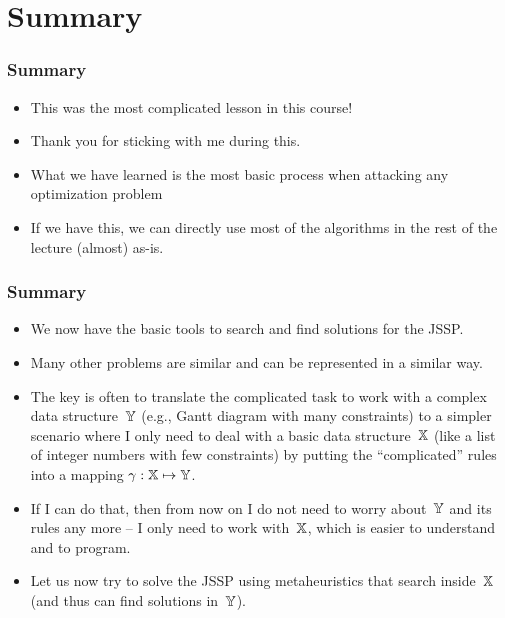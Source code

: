 \documentclass[mathserif]{beamer}%
\begin{document}
\section{Summary}%
%
\begin{frame}%
\frametitle{Summary}%
\begin{itemize}%
\item This was the most complicated lesson in this course!%
\item<2-> Thank you for sticking with me during this.%
\item<3-> What we have learned is the most basic process when attacking any optimization problem%
\item<11-> If we have this, we can directly use most of the algorithms in the rest of the lecture (almost) as-is.%
\end{itemize}%
\end{frame}%
%
\begin{frame}%
\frametitle{Summary}%
\begin{itemize}%
\item We now have the basic tools to search and find solutions for the JSSP.%
\item<2-> Many other problems are similar and can be represented in a similar way.%
\item<3-> The key is often to translate the complicated task to work with a complex data structure~$\mathbb{Y}$ (e.g., Gantt diagram with many constraints) to a simpler scenario where I only need to deal with a basic data structure~$\mathbb{X}$ (like a list of integer numbers with few constraints) by putting the ``complicated'' rules into a mapping $\gamma:\mathbb{X}\mapsto\mathbb{Y}$.%
\item<4-> If I can do that, then from now on I do not need to worry about~$\mathbb{Y}$ and its rules any more -- I only need to work with~$\mathbb{X}$, which is easier to understand and to program.%
\item<5-> Let us now try to solve the JSSP using metaheuristics that search inside~$\mathbb{X}$ (and thus can find solutions in~$\mathbb{Y}$).%
\end{itemize}%
\end{frame}%
%
%
\endPresentation%
\end{document}
